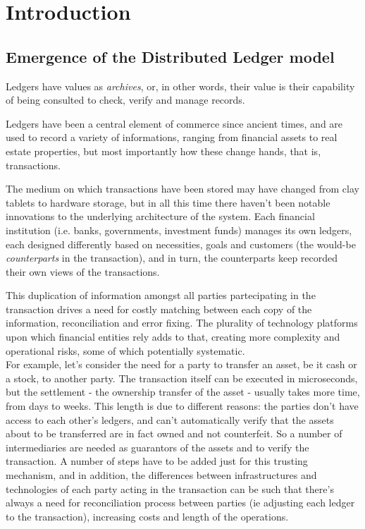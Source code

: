 \chapter{Introduction}
\label{chap:introduction}


\section{Emergence of the Distributed Ledger model}

Ledgers have values as \textit{archives}, or, in other words, their value is their capability of being consulted to check, verify and manage records.

Ledgers have been a central element of commerce since ancient times, and are used to record a variety of informations, ranging from financial assets to real estate properties, but most importantly how these change hands, that is, transactions.

The medium on which transactions have been stored may have changed from clay tablets to hardware storage, but in all this time there haven't been notable innovations to the underlying architecture of the system.
Each financial institution (i.e. banks, governments, investment funds) manages its own ledgers, each designed differently based on necessities, goals and customers (the would-be \textit{counterparts} in the transaction), and in turn, the counterparts keep recorded their own views of the transactions.

This duplication of information amongst all parties partecipating in the transaction drives a need for costly matching between each copy of the information, reconciliation and error fixing. The plurality of technology platforms upon which financial entities rely adds to that, creating more complexity and operational risks, some of which potentially systematic. \\

For example, let's consider the need for a party to transfer an asset, be it cash or a stock, to another party. The transaction itself can be executed in microseconds, but the settlement - the ownership transfer of the asset - usually takes more time, from days to weeks.
This length is due to different reasons: the parties don't have access to each other's ledgers, and can't automatically verify that the assets about to be transferred are in fact owned and not counterfeit. So a number of intermediaries are needed as guarantors of the assets and to verify the transaction. 
A number of steps have to be added just for this trusting mechanism, and in addition, the differences between infrastructures and technologies of each party acting in the transaction can be such that there's always a need for reconciliation process between parties (ie adjusting each ledger to the transaction), increasing costs and length of the operations.  \\

